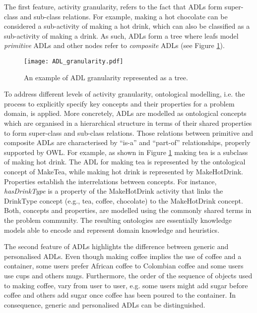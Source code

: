 The first feature, activity granularity, refers to the fact that ADLs form super-class and sub-class relations. For example, making a hot chocolate can be considered a sub-activity of making a hot drink, which can also be classified as a sub-activity of making a drink. As such, ADLs form a tree where leafs model \textit{primitive} ADLs and other nodes refer to \textit{composite} ADLs (see Figure \ref{fig-adl-granularity}).

\begin{figure}[htbp]%
\centering
\texttt{[image: ADL\_granularity.pdf]}
    \caption{An example of ADL granularity represented as a tree.} 
    \label{fig-adl-granularity}
\end{figure}

To address different levels of activity granularity, ontological modelling, i.e. the process to explicitly specify key concepts and their properties for a problem domain, is applied. More concretely, ADLs are modelled as ontological concepts which are organised in a hierarchical structure in terms of their shared properties to form super-class and sub-class relations. Those relations between primitive and composite ADLs are characterised by ``is-a'' and ``part-of'' relationships, properly supported by OWL. For example, as shown in Figure \ref{fig-adl-granularity} making tea is a subclass of making hot drink. The ADL for making tea is represented by the ontological concept of MakeTea, while making hot drink is represented by MakeHotDrink. Properties establish the interrelations between concepts. For instance, \textit{hasDrinkType} is a property of the MakeHotDrink activity that links the DrinkType concept (e.g., tea, coffee, chocolate) to the MakeHotDrink concept. Both, concepts and properties, are modelled using the commonly shared terms in the problem community. The resulting ontologies are essentially knowledge models able to encode and represent domain knowledge and heuristics. 

The second feature of ADLs highlights the difference between generic and personalised ADLs. Even though making coffee implies the use of coffee and a container, some users prefer African coffee to Colombian coffee and some users use cups and others mugs. Furthermore, the order of the sequence of objects used to making coffee, vary from user to user, e.g. some users might add sugar before coffee and others add sugar once coffee has been poured to the container. In consequence, generic and personalised ADLs can be distinguished.

